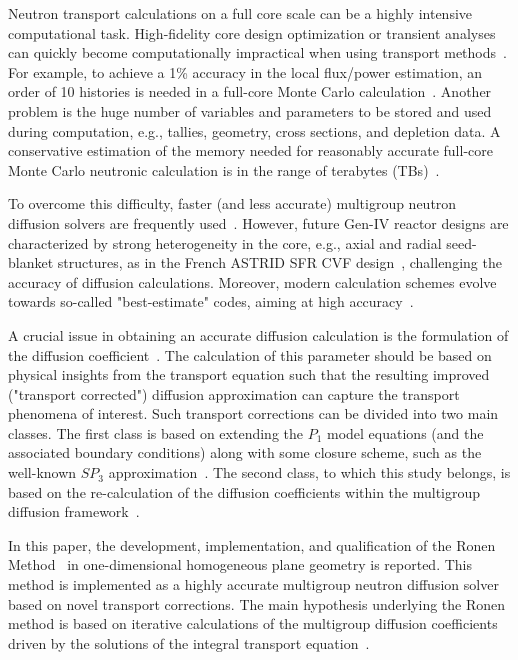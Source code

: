 Neutron transport calculations on a full core scale can be a highly intensive computational task. High-fidelity core design optimization or transient analyses can quickly become computationally impractical when using transport methods~\cite{Kim-2019}. For example, to achieve a 1\% accuracy in the local flux/power estimation, an order of 10 histories is needed in a full-core Monte Carlo calculation~\cite{Martin-2012}. Another problem is the huge number of variables and parameters to be stored and used during computation, e.g., tallies, geometry, cross sections, and depletion data. A conservative estimation of the memory needed for reasonably accurate full-core Monte Carlo neutronic calculation is in the range of terabytes (TBs)~\cite{Martin-2012}.   

To overcome this difficulty, faster (and less accurate) multigroup neutron diffusion solvers are frequently used~\cite{Lawrence-1986,Smith-1986}. However, future Gen-IV reactor designs are characterized by strong heterogeneity in the core, e.g., axial and radial seed-blanket structures, as in the French ASTRID SFR CVF design~\cite{Bertrand-2016}, challenging the accuracy of diffusion calculations. Moreover, modern calculation schemes evolve towards so-called "best-estimate" codes, aiming at high accuracy~\cite{IAEA-BE-2008}. 

A crucial issue in obtaining an accurate diffusion calculation is the formulation of the diffusion coefficient~\cite{Bell-1970,Pounders-2009}. The calculation of this parameter should be based on physical insights from the transport equation such that the resulting improved ("transport corrected") diffusion approximation can capture the transport phenomena of interest. Such transport corrections can be divided into two main classes. The first class is based on extending the $P_1$ model equations (and the associated boundary conditions) along with some closure scheme, such as the well-known $SP_3$ approximation~\cite{Brantley-2000}. The second class, to which this study belongs, is based on the re-calculation of the diffusion coefficients within the multigroup diffusion framework~\cite{Tomatis-2011}. 

In this paper, the development, implementation, and qualification of the Ronen Method~\cite{Ronen-2004} in one-dimensional homogeneous  plane geometry is reported. This method is implemented as a highly accurate multigroup neutron diffusion solver based on novel transport corrections. The main hypothesis underlying the Ronen method is based on iterative calculations of the multigroup diffusion coefficients driven by the solutions of the integral transport equation~\cite{Ronen-2004,Tomatis-2011}. 

